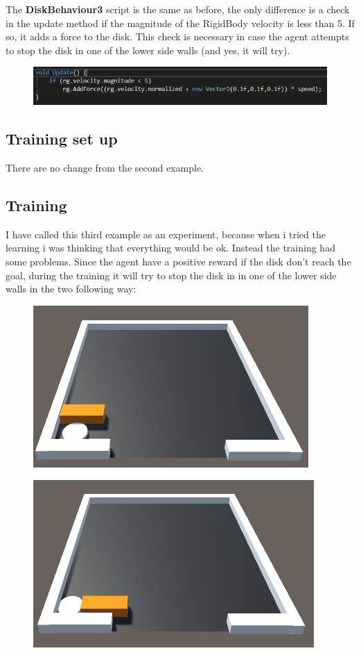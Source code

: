 \documentclass[12pt]{article}
\begin{document}
	\noindent
	The \textbf{DiskBehaviour3} script is the same as before, the only difference  is a check in the update method if the magnitude of the RigidBody velocity is less than 5. If so, it adds a force to the disk. This check is necessary in case the agent attempts to stop the disk in one of the lower side walls (and yes, it will try).
	
	\begin{figure}[hbt!]
		\centering
		\includegraphics[width= 1
		\textwidth]{images/DiskBehaviour3.png}
	\end{figure}

	\subsection{Training set up}
	There are no change from the second example.
	
	\subsection{Training}
	I have called this third example as an experiment, because when i tried the learning i was thinking that everything would be ok. Instead the training had some problems. Since the agent have a positive reward if the disk don't reach the goal, during the training it will try to stop the disk in in one of the lower side walls in the two following way:
	
	\begin{figure}[hbt!]
		\centering
		\includegraphics[width= 0.49
		\textwidth]{images/Obstacle1.png}
	\end{figure}

	\begin{figure}[hbt!]
		\centering
		\includegraphics[width= 0.49
		\textwidth]{images/Obstacle2.png}
	\end{figure}
	
\end{document}
